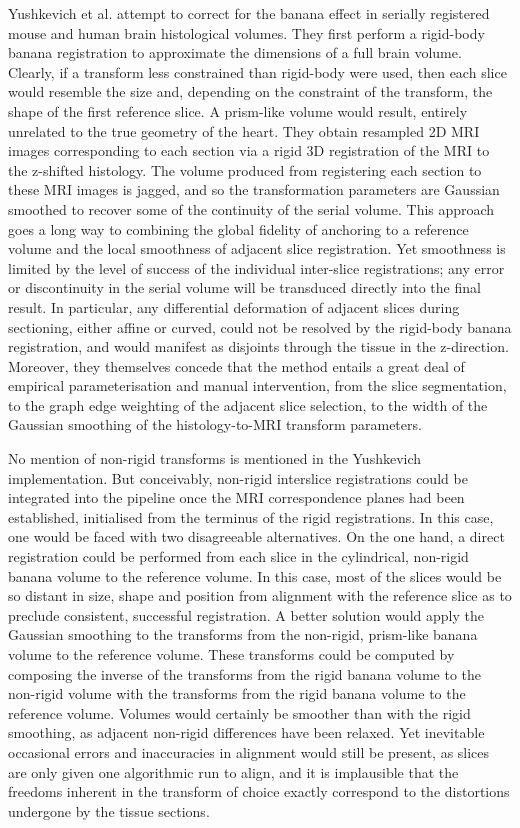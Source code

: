   Yushkevich et al. attempt to correct for the banana effect in serially registered mouse \cite{Yushkevich2006} and human \cite{Adler2012} brain histological volumes. They first perform a rigid-body banana registration to approximate the dimensions of a full brain volume. Clearly, if a transform less constrained than rigid-body were used, then each slice would resemble the size and, depending on the constraint of the transform, the shape of the first reference slice. A prism-like volume would result, entirely unrelated to the true geometry of the heart. They obtain resampled 2D MRI images corresponding to each section via a rigid 3D registration of the MRI to the z-shifted histology. The volume produced from registering each section to these MRI images is jagged, and so the transformation parameters are Gaussian smoothed to recover some of the continuity of the serial volume. This approach goes a long way to combining the global fidelity of anchoring to a reference volume and the local smoothness of adjacent slice registration. Yet smoothness is limited by the level of success of the individual inter-slice registrations; any error or discontinuity in the serial volume will be transduced directly into the final result. In particular, any differential deformation of adjacent slices during sectioning, either affine or curved, could not be resolved by the rigid-body banana registration, and would manifest as disjoints through the tissue in the z-direction. Moreover, they themselves concede that the method entails a great deal of empirical parameterisation and manual intervention, from the slice segmentation, to the graph edge weighting of the adjacent slice selection, to the width of the Gaussian smoothing of the histology-to-MRI transform parameters.
  
  No mention of non-rigid transforms is mentioned in the Yushkevich implementation. But conceivably, non-rigid interslice registrations could be integrated into the pipeline once the MRI correspondence planes had been established, initialised from the terminus of the rigid registrations. In this case, one would be faced with two disagreeable alternatives. On the one hand, a direct registration could be performed from each slice in the cylindrical, non-rigid banana volume to the reference volume. In this case, most of the slices would be so distant in size, shape and position from alignment with the reference slice as to preclude consistent, successful registration. A better solution would apply the Gaussian smoothing to the transforms from the non-rigid, prism-like banana volume to the reference volume. These transforms could be computed by composing the inverse of the transforms from the rigid banana volume to the non-rigid volume with the transforms from the rigid banana volume to the reference volume. Volumes would certainly be smoother than with the rigid smoothing, as adjacent non-rigid differences have been relaxed. Yet inevitable occasional errors and inaccuracies in alignment would still be present, as slices are only given one algorithmic run to align, and it is implausible that the freedoms inherent in the transform of choice exactly correspond to the distortions undergone by the tissue sections.
  
